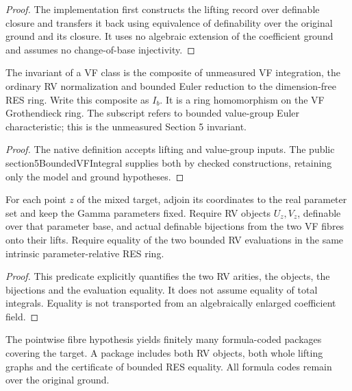 \begin{proof}
The implementation first constructs the lifting record over definable closure and transfers it back using equivalence of definability over the original ground and its closure. It uses no algebraic extension of the coefficient ground and assumes no change-of-base injectivity.
\end{proof}

\begin{definition}
\label{integral}
\leanok
{}
The invariant of a VF class is the composite of unmeasured VF integration, the ordinary RV normalization and bounded Euler reduction to the dimension-free RES ring. Write this composite as $I_b$. It is a ring homomorphism on the VF Grothendieck ring. The subscript refers to bounded value-group Euler characteristic; this is the unmeasured Section 5 invariant.
\end{definition}

\begin{proof}
The native definition accepts lifting and value-group inputs. The public section5BoundedVFIntegral supplies both by checked constructions, retaining only the model and ground hypotheses.
\end{proof}

\begin{definition}
\label{fibre}
\leanok
{}
For each point $z$ of the mixed target, adjoin its coordinates to the real parameter set and keep the Gamma parameters fixed. Require RV objects $U_z,V_z$, definable over that parameter base, and actual definable bijections from the two VF fibres onto their lifts. Require equality of the two bounded RV evaluations in the same intrinsic parameter-relative RES ring.
\end{definition}

\begin{proof}
This predicate explicitly quantifies the two RV arities, the objects, the bijections and the evaluation equality. It does not assume equality of total integrals. Equality is not transported from an algebraically enlarged coefficient field.
\end{proof}

\begin{lemma}
\label{catalog}
\leanok
{}
The pointwise fibre hypothesis yields finitely many formula-coded packages covering the target. A package includes both RV objects, both whole lifting graphs and the certificate of bounded RES equality. All formula codes remain over the original ground.
\end{lemma}

